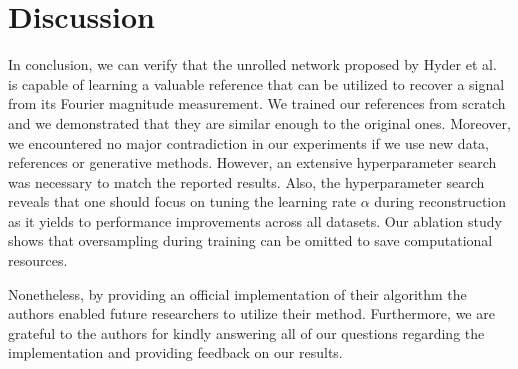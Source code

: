 \section{Discussion}


In conclusion, we can verify that the unrolled network proposed by Hyder et al.~\cite{hyder2020solving} is capable of learning a valuable reference that can be utilized to recover a signal from its Fourier magnitude measurement. We trained our references from scratch and we demonstrated that they are similar enough to the original ones. Moreover, we encountered no major contradiction in our experiments if we use new data, references or generative methods.
However, an extensive hyperparameter search was necessary to match the reported results.  Also, the hyperparameter search reveals that one should focus on tuning the learning rate $\alpha$ during reconstruction as it yields to performance improvements across all datasets. Our ablation study shows that oversampling during training can be omitted to save computational resources.

Nonetheless, by providing an official implementation of their algorithm the authors enabled future researchers to utilize their method. Furthermore, we are grateful to the authors for kindly answering all of our questions regarding the implementation and providing feedback on our results.





